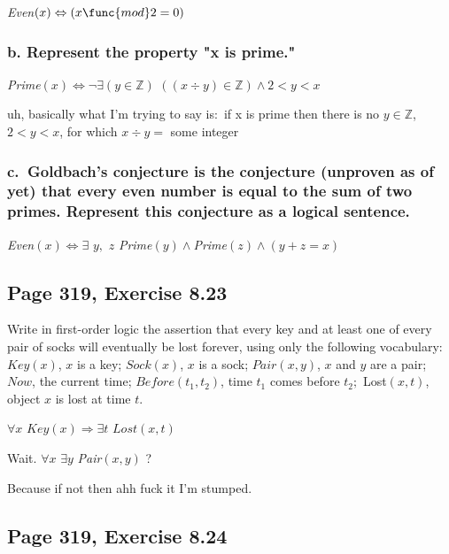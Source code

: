 \documentclass{article}
\begin{document}
\textit{Even}$\left( x\right) \Leftrightarrow \left( x\func{mod}2=0\right) $

\subsubsection{b. Represent the property "x is prime."}

\textit{Prime}$\left( x\right) \Leftrightarrow \lnot \exists \left( y\in 
\mathbb{Z}
\right) $ $\left( \left( x\div y\right) \in 
\mathbb{Z}
\right) \wedge 2<y<x$

uh, basically what I'm trying to say is:\ if x is prime then there is no $%
y\in 
\mathbb{Z}
$, $2<y<x$, for which $x\div y=$ some integer

\subsubsection{c.\ Goldbach's conjecture is the conjecture (unproven as of
yet) that every even number is equal to the sum of two primes. Represent
this conjecture as a logical sentence.}

\textit{Even}$\left( x\right) \Leftrightarrow \exists $ $y,$ $z$ \textit{%
Prime}$\left( y\right) \wedge $\textit{Prime}$\left( z\right) \wedge \left(
y+z=x\right) $

\subsection{Page 319, Exercise 8.23}

Write in first-order logic the assertion that every key and at least one of
every pair of socks will eventually be lost forever, using only the
following vocabulary: $Key\left( x\right) $, $x$ is a key; $Sock\left(
x\right) $, $x$ is a sock; $Pair\left( x,y\right) $, $x$ and $y$ are a pair; 
$Now$, the current time; $Before\left( t_{1},t_{2}\right) $, time $t_{1}$
comes before $t_{2};$ Lost$\left( x,t\right) $, object $x$ is lost at time $t
$.

$\forall x$ $Key\left( x\right) \Rightarrow \exists t$ $Lost\left(
x,t\right) $

Wait. $\forall x$ $\exists y$ \textit{Pair}$\left( x,y\right) $ ?

Because if not then ahh fuck it I'm stumped.

\subsection{Page 319, Exercise 8.24}
\end{document}
